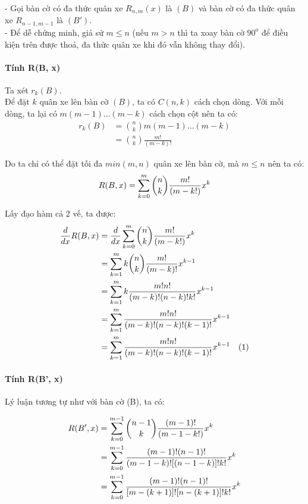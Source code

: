 \documentclass[main.tex]{subfiles}
\begin{document}
- Gọi bàn cờ có đa thức quân xe $R_{n,m}(x)$ là $(B)$ và bàn cờ có đa thức quân xe $R_{n-1,m-1}$ là $(B')$. \\
- Để dễ chứng minh, giả sử $m \le n$ (nếu $m > n$ thì ta xoay bàn cờ $90^\text{o}$ để điều kiện trên được thoả, đa thức quân xe khi đó vẫn không thay đổi).

\paragraph*{Tính R(B, x)}
\hphantom{1pt}\par
Ta xét $r_k(B)$.\\
Để đặt $k$ quân xe lên bàn cờ $(B)$, ta có $C(n, k)$ cách chọn dòng. Với mỗi dòng, ta lại có $m(m-1)...(m-k)$ cách chọn cột nên ta có:
$$
\begin{aligned}
r_k(B) &= {n\choose k}m(m-1)\dots(m-k) \\
&= {n\choose k}\frac{m!}{(m-k)!}
\end{aligned}
$$

Do ta chỉ có thể đặt tối đa $min(m,n)$ quân xe lên bàn cờ, mà $m\le n$ nên ta có:
$$
R(B, x) = \sum_{k=0}^{m}{{n\choose k}\frac{m!}{(m-k!)}x^k}
$$

Lấy đạo hàm cả 2 vế, ta được:
\begin{equation*}
\begin{aligned}
\frac{d}{dx}R(B,x) &= \frac{d}{dx}\sum_{k=0}^{m}{{n\choose k}\frac{m!}{(m-k!)}x^k} \\
&= \sum_{k=1}^{m}{k{n\choose k}\frac{m!}{(m-k)!}x^{k-1}} \\
& =\sum_{k=1}^{m}{k\frac{m!n!}{(m-k)!(n-k)!k!}x^{k-1}} \\
& =\sum_{k=1}^{m}{\frac{m!n!}{(m-k)!(n-k)!(k-1)!}x^{k-1}} \\
& =\sum_{k=1}^{m}{\frac{m!n!}{(m-k)!(n-k)!(k-1)!}x^{k-1}} \quad \text{(1)}\\
\end{aligned}
\end{equation*}

\paragraph*{Tính R(B', x)}
\hphantom{1pt}\par 
Lý luận tương tự như với bàn cờ (B), ta có:

\begin{equation*}
\begin{aligned}
R(B',x) &=  \sum_{k=0}^{m-1}{{n-1\choose k}\frac{(m-1)!}{(m-1-k!)}x^k} \\
&= \sum_{k=0}^{m-1}{\frac{(m-1)!(n-1)!}{(m-1-k)![(n-1-k)]!k!}x^{k}} \\
&= \sum_{k=0}^{m-1}{\frac{(m-1)!(n-1)!}{\left[m-(k+1)\right]![n-(k+1)]!k!}x^{k}}
\end{aligned}
\end{equation*}
\end{document}
